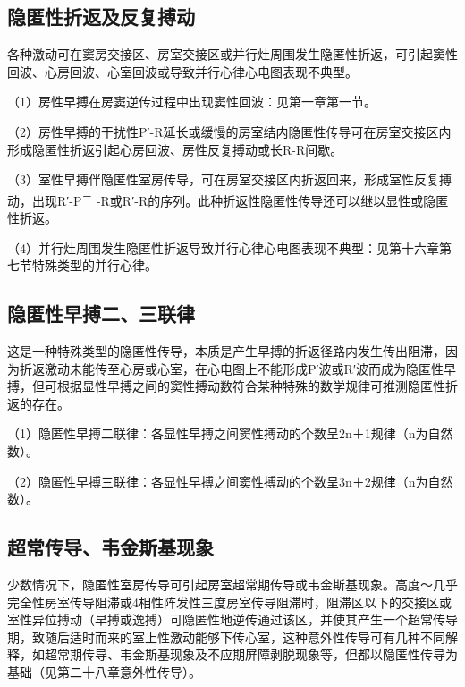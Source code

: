 \protect\hypertarget{text00042.htmlux5cux23subid461}{}{}

\subsection{隐匿性折返及反复搏动}

各种激动可在窦房交接区、房室交接区或并行灶周围发生隐匿性折返，可引起窦性回波、心房回波、心室回波或导致并行心律心电图表现不典型。

（1）房性早搏在房窦逆传过程中出现窦性回波：见第一章第一节。

（2）房性早搏的干扰性P′-R延长或缓慢的房室结内隐匿性传导可在房室交接区内形成隐匿性折返引起心房回波、房性反复搏动或长R-R间歇。

（3）室性早搏伴隐匿性室房传导，可在房室交接区内折返回来，形成室性反复搏动，出现R′-P\textsuperscript{－}
-R或R′-R的序列。此种折返性隐匿性传导还可以继以显性或隐匿性折返。

（4）并行灶周围发生隐匿性折返导致并行心律心电图表现不典型：见第十六章第七节特殊类型的并行心律。

\protect\hypertarget{text00042.htmlux5cux23subid462}{}{}

\subsection{隐匿性早搏二、三联律}

这是一种特殊类型的隐匿性传导，本质是产生早搏的折返径路内发生传出阻滞，因为折返激动未能传至心房或心室，在心电图上不能形成P′波或R′波而成为隐匿性早搏，但可根据显性早搏之间的窦性搏动数符合某种特殊的数学规律可推测隐匿性折返的存在。

（1）隐匿性早搏二联律：各显性早搏之间窦性搏动的个数呈2n＋1规律（n为自然数）。

（2）隐匿性早搏三联律：各显性早搏之间窦性搏动的个数呈3n＋2规律（n为自然数）。

\protect\hypertarget{text00042.htmlux5cux23subid463}{}{}

\subsection{超常传导、韦金斯基现象}

少数情况下，隐匿性室房传导可引起房室超常期传导或韦金斯基现象。高度～几乎完全性房室传导阻滞或4相性阵发性三度房室传导阻滞时，阻滞区以下的交接区或室性异位搏动（早搏或逸搏）可隐匿性地逆传通过该区，并使其产生一个超常传导期，致随后适时而来的室上性激动能够下传心室，这种意外性传导可有几种不同解释，如超常期传导、韦金斯基现象及不应期屏障剥脱现象等，但都以隐匿性传导为基础（见第二十八章意外性传导）。

